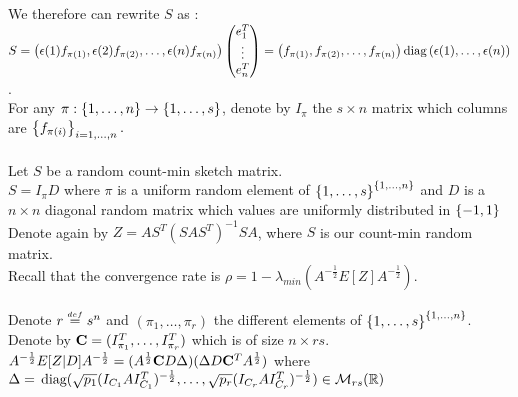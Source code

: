 We therefore can rewrite $S$ as :\\
 $S = \left( \epsilon(1)f_{\pi(1)},\epsilon(2)f_{\pi(2)},\dots,\epsilon(n)f_{\pi(n)} \right) \begin{pmatrix} e_{1}^{T} \\ \vdots \\ e_{n}^{T} \end{pmatrix} = \left( f_{\pi(1)}, f_{\pi(2)},\dots, f_{\pi(n)} \right) \text{diag}\left(\epsilon(1),\dots,\epsilon(n)\right)$.\\
 

For any $\pi : \left\{1,\dots,n\right\} \rightarrow \left\{1,\dots,s\right\} $, denote by $I_{\pi}$ the $s\times n$ matrix which columns are $\left\{f_{\pi(i)}\right\}_{i=1,\dots,n}.$\\\\

Let $S$ be a random count-min sketch matrix.\\
 $S = I_{\pi} D$ where $\pi$ is a uniform random element of $\left\{1,\dots,s\right\}^{\left\{1,\dots,n\right\}}$ and $D$ is a $n\times n$ diagonal random matrix which values are uniformly distributed in $\left\{-1,1\right\}$ \\

Denote again by $Z = A S^{T} (S A S^{T})^{-1} S A$, where $S$ is our count-min random matrix.\\
Recall that the convergence rate is  $\rho = 1 - \lambda_{min}(A^{-\frac12}E[Z]A^{-\frac12}  )$.\\\\

Denote $r \stackrel{{\scriptscriptstyle{def}}}{=} s^{n}$ and $(\pi_{1},\dots,\pi_{r})$ the different elements of $\left\{1,\dots,s\right\}^{\left\{1,\dots,n\right\}}$.\\
Denote by $\bold{C} = (I_{\pi_{1}}^{T},\dots,I_{\pi_{r}}^{T})$ which is of size $ n \times r s$.\\

$A^{-\frac12}E[Z|D]A^{-\frac12} = (A^{\frac 12} \bold{C} D \Delta)(\Delta D \bold{C}^{T} A^{\frac 12})$ where \\$\Delta =  \,\text{diag}(\sqrt{p_{1}} (I_{C_{1}}A I_{C_{1}}^{T})^{-\frac 12},\dots, \sqrt{p_{r}}(I_{C_{r}} A I_{C_{r}}^{T})^{-\frac 12}) \in {\mathcal M}_{r s}({\mathbb R})$

 
\pr 

